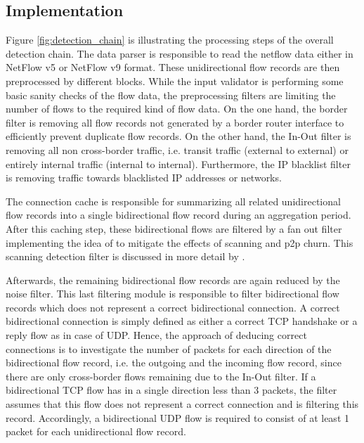 \subsection{Implementation}
Figure \ref{fig:detection_chain} is illustrating the processing steps of the 
overall detection chain. The data parser is responsible to read the netflow data 
either in NetFlow v5 or NetFlow v9 format. These unidirectional flow records are 
then preprocessed by different blocks. While the input validator is performing 
some basic sanity checks of the flow data, the preprocessing filters are 
limiting the number of flows to the required kind of flow data. On the one hand, 
the border filter is removing all flow records not generated by a border router 
interface to efficiently prevent duplicate flow records. On the other hand, the 
In-Out filter is removing all non cross-border traffic, i.e. transit traffic 
(external to external) or entirely internal traffic (internal to internal). 
Furthermore, the IP blacklist filter is removing traffic towards blacklisted IP 
addresses or networks.

The connection cache is responsible for summarizing all related unidirectional 
flow records into a single bidirectional flow record during an aggregation 
period. After this caching step, these bidirectional flows are filtered by a fan 
out filter implementing the idea of \citet{Allman:2007} to mitigate the effects 
of scanning and p2p churn. This scanning detection filter is discussed in more 
detail by \citet{Schatzmann:Mining,Schatzmann:Dissection, Schatzmann:Tracing}. 

Afterwards, the remaining bidirectional flow records are again reduced by the 
noise filter. This last filtering module is responsible to filter bidirectional 
flow records which does not represent a correct bidirectional connection. A 
correct bidirectional connection is simply defined as either a correct TCP 
handshake or a reply flow as in case of UDP. Hence, the approach of deducing 
correct connections is to investigate the number of packets for each direction 
of the bidirectional flow record, i.e. the outgoing and the incoming flow 
record, since there are only cross-border flows remaining due to the In-Out 
filter. If a bidirectional TCP flow has in a single direction less than 3 
packets, the filter assumes that this flow does not represent a correct 
connection and is filtering this record. Accordingly, a bidirectional UDP 
flow is required to consist of at least 1 packet for each unidirectional flow 
record.

